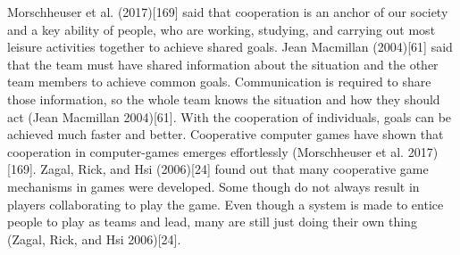 Morschheuser et al. (2017)[169] said that cooperation is an anchor of our society and a key
ability of people, who are working, studying, and carrying out most leisure activities together
to achieve shared goals. Jean Macmillan (2004)[61] said that the team must have shared information
about the situation and the other team members to achieve common goals. Communication
is required to share those information, so the whole team knows the situation and
how they should act (Jean Macmillan 2004)[61]. With the cooperation of individuals, goals can
be achieved much faster and better. Cooperative computer games have shown that cooperation
in computer-games emerges effortlessly (Morschheuser et al. 2017)[169]. Zagal, Rick, and Hsi
(2006)[24] found out that many cooperative game mechanisms in games were developed. Some
though do not always result in players collaborating to play the game. Even though a system
is made to entice people to play as teams and lead, many are still just doing their own thing
(Zagal, Rick, and Hsi 2006)[24].